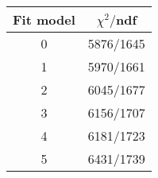\begin{tabular}{c|c}
Fit model & $\chi^2/$ndf \\
\hline
0 & 5876/1645\\
1 & 5970/1661\\
2 & 6045/1677\\
3 & 6156/1707\\
4 & 6181/1723\\
5 & 6431/1739\\
\end{tabular}
